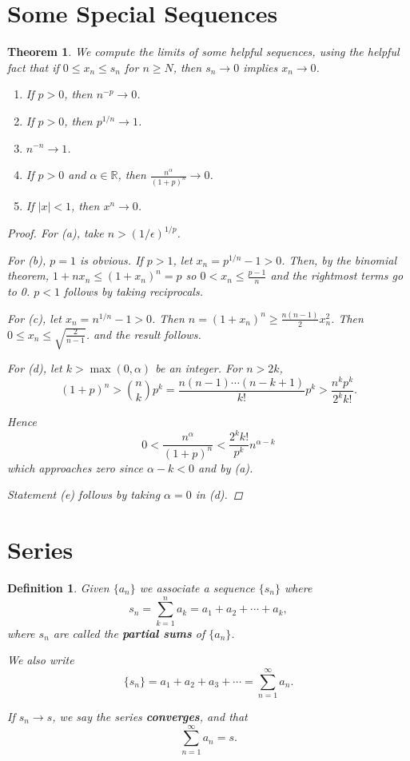 \documentclass{scrbook}
\newcommand{\R}{\mathbb{R}}
\renewcommand{\to}{\rightarrow}
\newtheorem{theorem}{Theorem}
\newtheorem{definition}{Definition}
\begin{document}
\section{Some Special Sequences}

\begin{theorem} %
We compute the limits of some helpful sequences, using the helpful fact that if $0 \le x_n \le s_n$ for $n \ge N$, then $s_n \to 0$ implies $x_n \to 0$. 

\begin{enumerate}
\item If $p > 0$, then $n^{-p} \to 0$.
\item If $p > 0$, then $p^{1/n} \to 1$.
\item $n^{-n} \to 1$.
\item If $p > 0$ and $\alpha \in \R$, then $\frac{n^{\alpha}}{(1 + p)^n} \to 0$. 
\item If $|x| < 1$, then $x^n \to 0$.
\end{enumerate}

\begin{proof}
For (a), take $n > (1/\epsilon)^{1/p}$.

For (b), $p = 1$ is obvious. If $p > 1$, let $x_n = p^{1/n} - 1 > 0$. Then, by the binomial theorem, $1 + nx_n \le (1 + x_n)^n = p$ so $0 < x_n \le \frac{p - 1}{n}$ and the rightmost terms go to 0. $p < 1$ follows by taking reciprocals.

For (c), let $x_n = n^{1/n} - 1 > 0$. Then $n = (1 + x_n)^n \ge \frac{n(n-1)}{2} x_n^2$. Then $0 \le x_n \le \sqrt{\frac{2}{n - 1}}$. and the result follows.

For (d), let $k > \max(0, \alpha)$ be an integer. For $n > 2k$, 
\[
	(1 + p)^n > \binom{n}{k} p^k = \frac{n(n - 1) \cdots (n - k + 1)}{k!} p^k > \frac{n^k p^k}{2^k k!}.
\]

Hence
\[
	0 < \frac{n^\alpha}{(1 + p)^n} < \frac{2^k k!}{p^k} n^{\alpha - k}
\]
which approaches zero since $\alpha - k < 0$ and by (a).

Statement (e) follows by taking $\alpha = 0$ in (d). 
\end{proof}
\end{theorem}

\section{Series}

\begin{definition} %
Given $\{a_n\}$ we associate a sequence $\{s_n\}$ where
\[
	s_n = \sum_{k=1}^{n} a_k = a_1 + a_2 + \dotsb + a_k,
\]
where $s_n$ are called the \textbf{partial sums} of $\{a_n\}$.

We also write
\[
	\{s_n\} = a_1 + a_2 + a_3 + \dotsb = \sum_{n=1}^{\infty} a_n.
\]

If $s_n \to s$, we say the series \textbf{converges}, and that
\[
	\sum_{n=1}^{\infty} a_n = s.
\]
\end{definition}
\end{document}
